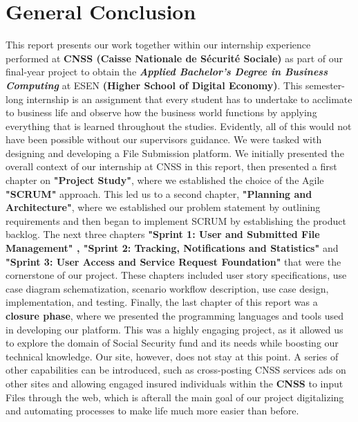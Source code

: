 \chapter*{General Conclusion}

This report presents our work together within our internship experience performed at \textbf{CNSS (Caisse Nationale de Sécurité Sociale)} as part of our final-year project to obtain the \textbf{\textit{Applied Bachelor's Degree in Business Computing}} at ESEN \textbf{(Higher School of Digital Economy)}.
\vspace{0.5cm}
This semester-long internship is an assignment that every student has to undertake to acclimate to business life and observe how the business world functions by applying everything that is learned throughout the studies. Evidently, all of this would not have been possible without our supervisors guidance.
\vspace{0.5cm}
We were tasked with designing and developing a File Submission platform.
\vspace{0.5cm}
We initially presented the overall context of our internship at CNSS in this report, then presented a first chapter on \textbf{"Project Study"}, where we established the choice of the Agile \textbf{"SCRUM"} approach. This led us to a second chapter, \textbf{"Planning and Architecture"}, where we established our problem statement by outlining requirements and then began to implement SCRUM by establishing the product backlog.
\vspace{0.5cm}
The next three chapters \textbf{"Sprint 1: User and Submitted File Management" , "Sprint 2: Tracking, Notifications and Statistics"} and \textbf{"Sprint 3: User Access and Service Request Foundation"} that were the cornerstone of our project. These chapters included user story specifications, use case diagram schematization, scenario workflow description, use case design, implementation, and testing.
\vspace{0.5cm}
Finally, the last chapter of this report was a \textbf{closure phase}, where we presented the programming languages and tools used in developing our platform.
\vspace{0.5cm}
This was a highly engaging project, as it allowed us to explore the domain of Social Security fund and its needs while boosting our technical knowledge.
\vspace{0.5cm}
Our site, however, does not stay at this point. A series of other capabilities can be introduced, such as cross-posting CNSS services ads on other sites and allowing engaged insured individuals within the \textbf{CNSS} to input Files through the web, which is afterall the main goal of our project digitalizing and automating processes to make life much more easier than before.